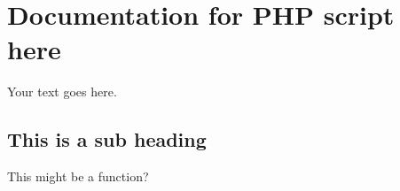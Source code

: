 \section{Documentation for PHP script here}

Your text goes here.

\subsection{This is a sub heading}

This might be a function?
